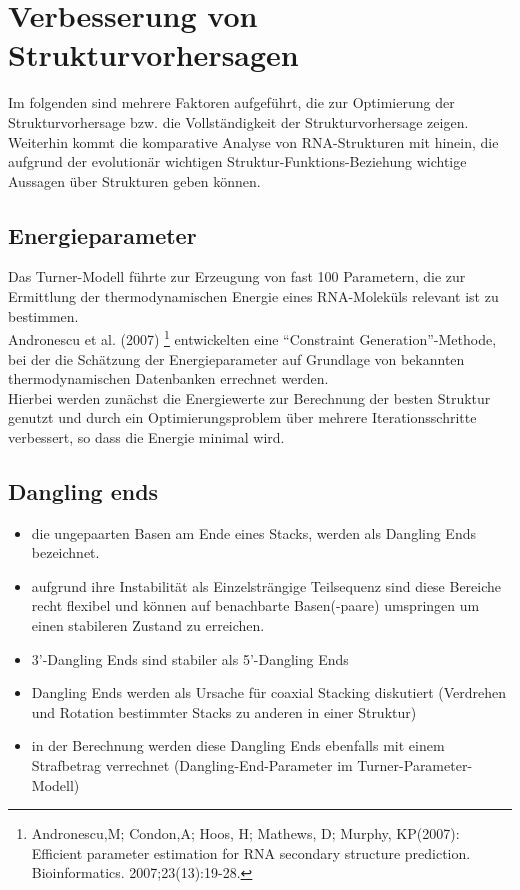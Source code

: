 \section{Verbesserung von Strukturvorhersagen}
Im folgenden sind mehrere Faktoren aufgeführt, die zur Optimierung der Strukturvorhersage bzw. die Vollständigkeit der Strukturvorhersage zeigen. Weiterhin kommt die komparative Analyse von RNA-Strukturen mit hinein, die aufgrund der evolutionär wichtigen Struktur-Funktions-Beziehung wichtige Aussagen über Strukturen geben können. 

\subsection{Energieparameter}
Das Turner-Modell führte zur Erzeugung von fast 100 Parametern, die zur Ermittlung der thermodynamischen Energie eines RNA-Moleküls relevant ist zu bestimmen. \\
Andronescu et al. (2007) \footnote{Andronescu,M; Condon,A; Hoos, H; Mathews, D; Murphy, KP(2007): Efficient parameter estimation for RNA secondary structure prediction. Bioinformatics. 2007;23(13):19-28.} entwickelten eine ``Constraint Generation''-Methode, bei der die Schätzung der Energieparameter auf Grundlage von bekannten thermodynamischen Datenbanken errechnet werden. \\
Hierbei werden zunächst die Energiewerte zur Berechnung der besten Struktur genutzt und durch ein Optimierungsproblem über mehrere Iterationsschritte verbessert, so dass die Energie minimal wird.

\subsection{Dangling ends}
\begin{itemize}
\item die ungepaarten Basen am Ende eines Stacks, werden als Dangling Ends bezeichnet.
\item aufgrund ihre Instabilität als Einzelsträngige Teilsequenz sind diese Bereiche recht flexibel und können auf benachbarte Basen(-paare) umspringen um einen stabileren Zustand zu erreichen.
\item 3'-Dangling Ends sind stabiler als 5'-Dangling Ends
\item Dangling Ends werden als Ursache für coaxial Stacking diskutiert (Verdrehen und Rotation bestimmter Stacks zu anderen in einer Struktur)
\item in der Berechnung werden diese Dangling Ends ebenfalls mit einem Strafbetrag verrechnet (Dangling-End-Parameter im Turner-Parameter-Modell)
\end{itemize}

